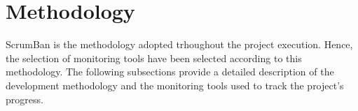 \section{Methodology}

ScrumBan is the methodology adopted trhoughout the project execution. Hence, the selection of monitoring tools have been selected according to this methodology. The following subsections provide a detailed description of the development methodology and the monitoring tools used to track the project's progress.

 
